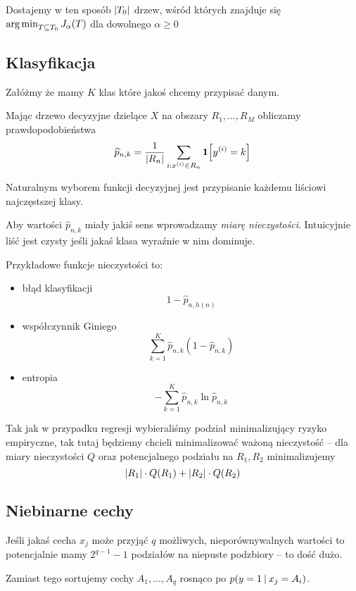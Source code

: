Dostajemy w ten sposób \( \card{T_0} \) drzew, wśród których znajduje się \( \operatorname*{arg\,min}_{T \subseteq T_0}  J_\alpha(T) \) dla dowolnego \( \alpha \geq 0 \)


\subsection{Klasyfikacja}

Załóżmy że mamy \( K \) klas które jakoś chcemy przypisać danym.

Mając drzewo decyzyjne dzielące \( X \) na obszary \( R_1, \dots, R_M \)
obliczamy prawdopodobieństwa
\[
    \widehat p_{n, k} = \frac{1}{\card{R_n}} \sum_{i : x^{(i)} \in R_n} \indicator{y^{(i)} = k}
\]

Naturalnym wyborem funkcji decyzyjnej jest przypisanie każdemu liściowi najczęstszej klasy.

Aby wartości \( \widehat p_{n, k} \) miały jakiś sens wprowadzamy \textit{miarę nieczystości}.
Intuicyjnie liść jest czysty jeśli jakaś klasa wyraźnie w nim dominuje.

Przykładowe funkcje nieczystości to:
\begin{itemize}
    \item błąd klasyfikacji
    \[
        1 - \widehat p_{n, h(n)}
    \]
    \item współczynnik Giniego
    \[
        \sum_{k=1}^K \widehat p_{n, k}(1 - \widehat p_{n, k})
    \]
    \item entropia
    \[
        -\sum_{k=1}^K \widehat p_{n, k} \ln \widehat p_{n, k}
    \]
\end{itemize}

Tak jak w przypadku regresji wybieraliśmy podział minimalizujący ryzyko empiryczne, tak tutaj będziemy chcieli minimalizować ważoną nieczystość -- dla miary nieczystości \( Q \) oraz potencjalnego podziału na \( R_1, R_2 \) minimalizujemy
\[
    \card{R_1} \cdot Q(R_1) + \card{R_2} \cdot Q(R_2)
\]

\subsection{Niebinarne cechy}

Jeśli jakaś cecha \( x_j \) może przyjąć \( q \) możliwych, nieporównywalnych wartości to potencjalnie mamy \( 2^{q - 1} - 1 \) podziałów na niepuste podzbiory -- to dość dużo.

Zamiast tego sortujemy cechy \( A_1, \dots, A_q \) rosnąco po \( p(y = 1 \:\vert\: x_j = A_i) \).

